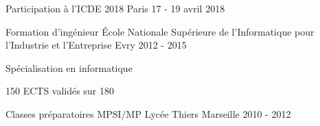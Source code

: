 
\begin{cventries}

\cventry
{}
{Participation à l'ICDE 2018}
{Paris}
{17 - 19 avril 2018}
{}

\cventry
{Formation d'ingénieur}
{\'Ecole Nationale Supérieure de l'Informatique pour l'Industrie et l'Entreprise}
{Evry}
{2012 - 2015}
{
	\begin{cvitems}
	\item{Spécialisation en informatique}
	\item{150 ECTS validés sur 180}
	\end{cvitems}
}

\cventry
{Classes préparatoires MPSI/MP}
{Lycée Thiers}
{Marseille}
{2010 - 2012}
{}

\end{cventries}